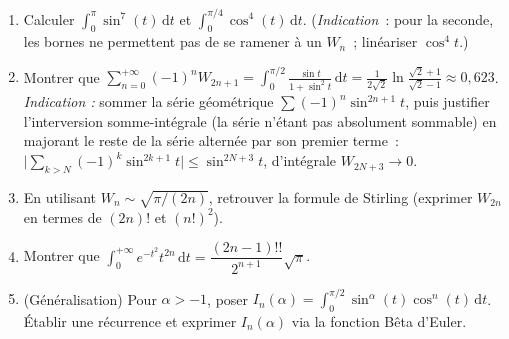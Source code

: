 \begin{mdframed}[style=exobar]
  \begin{enumerate}
    \item Calculer $\displaystyle\int_0^\pi\sin^7(t)\,\mathrm{d}t$ et
          $\displaystyle\int_0^{\pi/4}\cos^4(t)\,\mathrm{d}t$.
          (\textit{Indication}~: pour la seconde, les bornes ne permettent
          pas de se ramener à un $W_n$~; linéariser $\cos^4 t$.)

    \item Montrer que
          $\displaystyle\sum_{n=0}^{+\infty}{(-1)}^n W_{2n+1}
          =\int_0^{\pi/2}\frac{\sin t}{1+\sin^2 t}\,\mathrm{d}t
          =\frac{1}{2\sqrt{2}}\ln\!\frac{\sqrt{2}+1}{\sqrt{2}-1}\approx 0{,}623$.
          \textit{Indication :} sommer la série géométrique
          $\sum {(-1)}^n\sin^{2n+1}t$, puis justifier l'interversion
          somme-intégrale (la série n'étant pas absolument sommable) en
          majorant le reste de la série alternée par son premier terme~:
          $\bigl|\sum_{k>N}{(-1)}^k\sin^{2k+1}t\bigr|\leq\sin^{2N+3}t$,
          d'intégrale $W_{2N+3}\to 0$.

    \item En utilisant $W_n\sim\sqrt{\pi/(2n)}$, retrouver la formule
          de Stirling (exprimer $W_{2n}$ en termes de $(2n)!$ et ${(n!)}^2$).

    \item Montrer que $\displaystyle\int_0^{+\infty}e^{-t^2}t^{2n}\,\mathrm{d}t
          = \dfrac{(2n-1)!!}{2^{n+1}}\sqrt{\pi}$.

    \item (Généralisation) Pour $\alpha>-1$, poser
          $I_n(\alpha)=\int_0^{\pi/2}\sin^\alpha(t)\cos^n(t)\,\mathrm{d}t$.
          Établir une récurrence et exprimer $I_n(\alpha)$ via la fonction
          Bêta d'Euler.
  \end{enumerate}
\end{mdframed}

